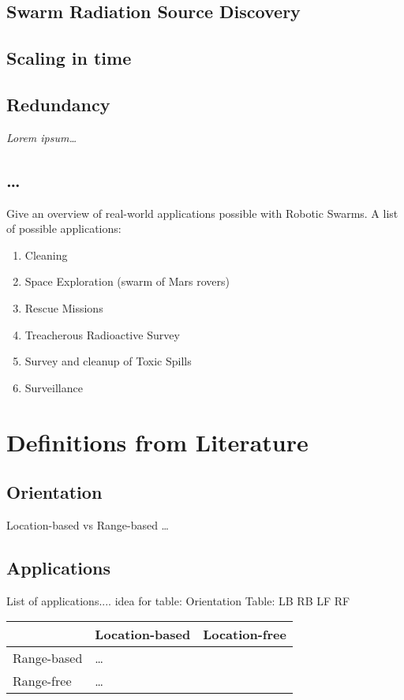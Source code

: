 \documentclass[a4paper]{article}
\begin{document}
  \subsection{Swarm Radiation Source Discovery}
  \subsection{Scaling in time}
  \subsection{Redundancy}
  
  \emph{Lorem ipsum\ldots}


  \subsection{\ldots}
  Give an overview of real-world applications possible with Robotic Swarms. A list of possible applications:
  \begin{enumerate}
    \item Cleaning
    \item Space Exploration (swarm of Mars rovers)
    \item Rescue Missions
    \item Treacherous Radioactive Survey
    \item Survey and cleanup of Toxic Spills
    \item Surveillance
  \end{enumerate}

\section{Definitions from Literature}

  \subsection{Orientation}
  Location-based vs Range-based \ldots
  \subsection{Applications}
  List of applications.... idea for table: Orientation Table: LB RB LF RF\\
  
  \begin{tabular}{|p{3cm}|p{3cm}|p{3cm}|}
    \hline
     & Location-based & Location-free\\\hline
    Range-based & \ldots & \\\hline
    Range-free & \ldots & \\
    \hline
  \end{tabular}
  
\end{document}
